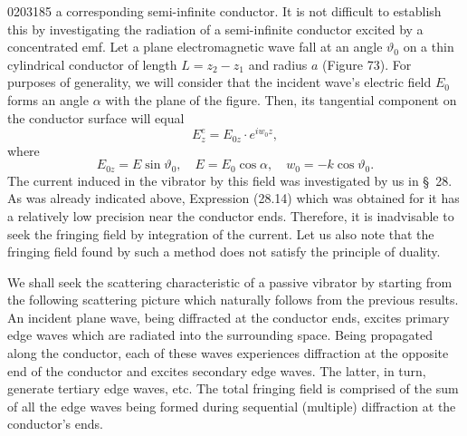 \begin{scanpage}{0203}{185}
\noindent a corresponding semi-infinite conductor. It is not difficult to establish this by investigating the radiation of a semi-infinite conductor excited by a concentrated emf.
Let a plane electromagnetic wave fall at an angle $\vartheta_0$ on a thin cylindrical conductor of length $L=z_2-z_1$ and radius $a$ (Figure 73). For purposes of generality, we will consider that the incident wave's electric field $E_0$ forms an angle $\alpha$ with the plane of the figure. Then, its tangential component on the conductor surface will equal
\[E_z^e=E_{0z}\cdot e^{iw_0z},\tag{30.01}\]
where
\[E_{0z}=E\sin\vartheta_0,\quad E=E_0\cos\alpha,\quad w_0=-k\cos\vartheta_0.\tag{30.02}\]
The current induced in the vibrator by this field was investigated by us in \S\ 28. As was already indicated above, Expression (28.14) which was obtained for it has a relatively low precision near the conductor ends. Therefore, it is inadvisable to seek the fringing field by integration of the current. Let us also note that the fringing field found by such a method does not satisfy the principle of duality.

We shall seek the scattering characteristic of a passive vibrator by starting from the following scattering picture which naturally follows from the previous results. An incident plane wave, being diffracted at the conductor ends, excites primary edge waves which are radiated into the surrounding space. Being propagated along the conductor, each of these waves experiences diffraction at the opposite end of the conductor and excites secondary edge waves. The latter, in turn, generate tertiary edge waves, etc. The total fringing field is comprised of the sum of all the edge waves being formed during sequential (multiple) diffraction at the conductor's ends.
\end{scanpage}
